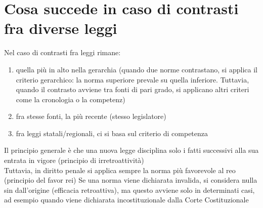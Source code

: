 \documentclass[10pt,oneside,a4paper]{article}
\begin{document}
	\section{Cosa succede in caso di contrasti fra diverse leggi}
	Nel caso di contrasti fra leggi rimane:
	\begin{enumerate}
		\item quella più in alto nella gerarchia (quando due norme contrastano, si applica il criterio gerarchico: la norma superiore prevale su quella inferiore. Tuttavia, quando il contrasto avviene tra fonti di pari grado, si applicano altri criteri come la cronologia o la competenz)
		\item fra stesse fonti, la più recente (stesso legislatore)
		\item fra leggi statali/regionali, ci si basa sul criterio di competenza
	\end{enumerate}
	Il principio generale è che una nuova legge disciplina solo i fatti successivi alla sua entrata in vigore (principio di irretroattività)\\
	Tuttavia, in diritto penale si applica sempre la norma più favorevole al reo (principio del favor rei)
	Se una norma viene dichiarata invalida, si considera nulla sin dall'origine (efficacia retroattiva), ma questo avviene solo in determinati casi, ad esempio quando viene dichiarata incostituzionale dalla Corte Costituzionale
\end{document}

